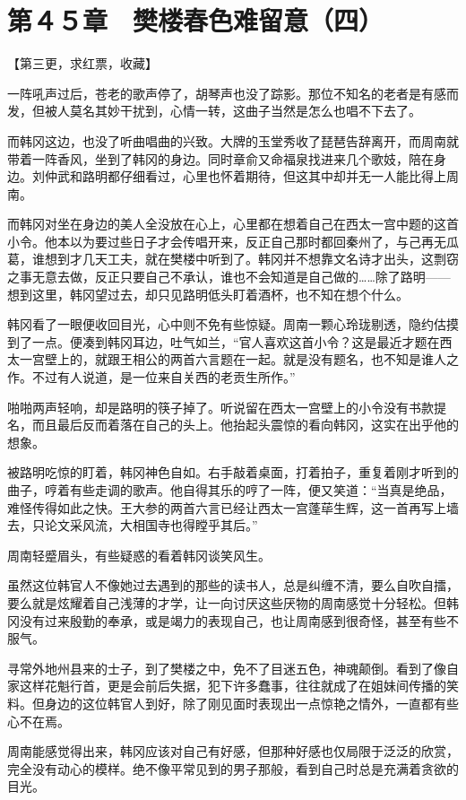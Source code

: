 \section{第４５章　樊楼春色难留意（四）}

【第三更，求红票，收藏】

一阵吼声过后，苍老的歌声停了，胡琴声也没了踪影。那位不知名的老者是有感而发，但被人莫名其妙干扰到，心情一转，这曲子当然是怎么也唱不下去了。

而韩冈这边，也没了听曲唱曲的兴致。大牌的玉堂秀收了琵琶告辞离开，而周南就带着一阵香风，坐到了韩冈的身边。同时章俞又命福泉找进来几个歌妓，陪在身边。刘仲武和路明都仔细看过，心里也怀着期待，但这其中却并无一人能比得上周南。

而韩冈对坐在身边的美人全没放在心上，心里都在想着自己在西太一宫中题的这首小令。他本以为要过些日子才会传唱开来，反正自己那时都回秦州了，与己再无瓜葛，谁想到才几天工夫，就在樊楼中听到了。韩冈并不想靠文名诗才出头，这剽窃之事无意去做，反正只要自己不承认，谁也不会知道是自己做的……除了路明——想到这里，韩冈望过去，却只见路明低头盯着酒杯，也不知在想个什么。

韩冈看了一眼便收回目光，心中则不免有些惊疑。周南一颗心玲珑剔透，隐约估摸到了一点。便凑到韩冈耳边，吐气如兰，“官人喜欢这首小令？这是最近才题在西太一宫壁上的，就跟王相公的两首六言题在一起。就是没有题名，也不知是谁人之作。不过有人说道，是一位来自关西的老贡生所作。”

啪啪两声轻响，却是路明的筷子掉了。听说留在西太一宫壁上的小令没有书款提名，而且最后反而着落在自己的头上。他抬起头震惊的看向韩冈，这实在出乎他的想象。

被路明吃惊的盯着，韩冈神色自如。右手敲着桌面，打着拍子，重复着刚才听到的曲子，哼着有些走调的歌声。他自得其乐的哼了一阵，便又笑道：“当真是绝品，难怪传得如此之快。王大参的两首六言已经让西太一宫蓬荜生辉，这一首再写上墙去，只论文采风流，大相国寺也得瞠乎其后。”

周南轻蹙眉头，有些疑惑的看着韩冈谈笑风生。

虽然这位韩官人不像她过去遇到的那些的读书人，总是纠缠不清，要么自吹自擂，要么就是炫耀着自己浅薄的才学，让一向讨厌这些厌物的周南感觉十分轻松。但韩冈没有过来殷勤的奉承，或是竭力的表现自己，也让周南感到很奇怪，甚至有些不服气。

寻常外地州县来的士子，到了樊楼之中，免不了目迷五色，神魂颠倒。看到了像自家这样花魁行首，更是会前后失据，犯下许多蠢事，往往就成了在姐妹间传播的笑料。但身边的这位韩官人到好，除了刚见面时表现出一点惊艳之情外，一直都有些心不在焉。

周南能感觉得出来，韩冈应该对自己有好感，但那种好感也仅局限于泛泛的欣赏，完全没有动心的模样。绝不像平常见到的男子那般，看到自己时总是充满着贪欲的目光。

